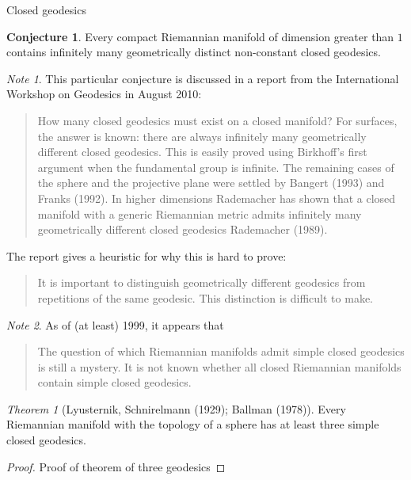 \documentclass{article}
\theoremstyle{definition}
\newtheorem{conjecture}{Conjecture}[section]
\theoremstyle{remark}
\newtheorem{remark}{Note}[section]
\newtheorem{theorem}{Theorem}[section]
\begin{document}
\begin{section}{Closed geodesics}
  \begin{conjecture}
    Every compact Riemannian manifold of dimension greater than $1$ contains infinitely
    many geometrically distinct non-constant closed geodesics.
  \end{conjecture}
  \begin{remark}
    This particular conjecture is discussed in a report from the
    International Workshop on Geodesics in August 2010:
    \begin{quote}
      How many closed geodesics must exist on a closed manifold? For surfaces, the
      answer is known: there are always infinitely many geometrically different
      closed geodesics. This is easily proved using Birkhoff’s first argument when
      the fundamental group is infinite. The remaining cases of the sphere and the
      projective plane were settled by Bangert (1993) and Franks (1992). In higher
      dimensions Rademacher has shown that a closed manifold with a generic
      Riemannian metric admits infinitely many geometrically different closed
      geodesics Rademacher (1989).
    \end{quote}
    The report gives a heuristic for why this is hard to prove: \begin{quote}
      It is important to distinguish geometrically different geodesics from
      repetitions of the same geodesic. This distinction is difficult to make.
    \end{quote}
  \end{remark}

  \begin{remark} %
    As of (at least) 1999, it appears that \begin{quote}
      The question of which Riemannian manifolds admit simple closed geodesics
      is still a mystery. It is not known whether all closed Riemannian
      manifolds contain simple closed geodesics.
    \end{quote}
  \end{remark}
  \begin{theorem}[Lyusternik, Schnirelmann (1929); Ballman (1978)]
    Every Riemannian manifold with the topology of a sphere has at least three
    simple closed geodesics.
  \end{theorem}

  \begin{proof}
    Proof of theorem of three geodesics
  \end{proof}


\end{section}
\end{document}
